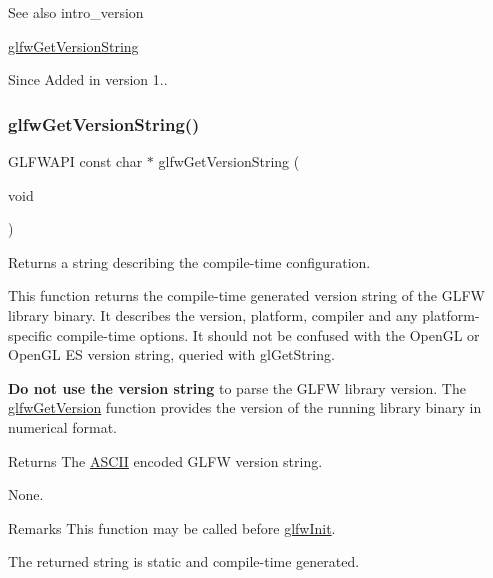 \begin{DoxySeeAlso}{See also}
intro\+\_\+version 

\hyperlink{group__init_gae5952184a0db36e24d1de7805b8b0945}{glfw\+Get\+Version\+String}
\end{DoxySeeAlso}
\begin{DoxySince}{Since}
Added in version 1.. 
\end{DoxySince}
\mbox{\label{group__init_gae5952184a0db36e24d1de7805b8b0945}} 
\subsubsection{\texorpdfstring{glfw\+Get\+Version\+String()}{glfwGetVersionString()}}
{\footnotesize\ttfamily G\+L\+F\+W\+A\+PI const char $\ast$ glfw\+Get\+Version\+String (\begin{DoxyParamCaption}\item[{void}]{ }\end{DoxyParamCaption})}



Returns a string describing the compile-\/time configuration. 

This function returns the compile-\/time generated version string of the G\+L\+FW library binary. It describes the version, platform, compiler and any platform-\/specific compile-\/time options. It should not be confused with the Open\+GL or Open\+GL ES version string, queried with {\ttfamily gl\+Get\+String}.

{\bfseries Do not use the version string} to parse the G\+L\+FW library version. The \hyperlink{group__init_ga2402c7824ac0194c13722790ff9559ff}{glfw\+Get\+Version} function provides the version of the running library binary in numerical format.

\begin{DoxyReturn}{Returns}
The \hyperlink{structASCII}{A\+S\+C\+II} encoded G\+L\+FW version string.
\end{DoxyReturn}
None.

\begin{DoxyRemark}{Remarks}
This function may be called before \hyperlink{group__init_gab41771f0215a2e0afb4cf1cf98082d40}{glfw\+Init}.
\end{DoxyRemark}
The returned string is static and compile-\/time generated.

